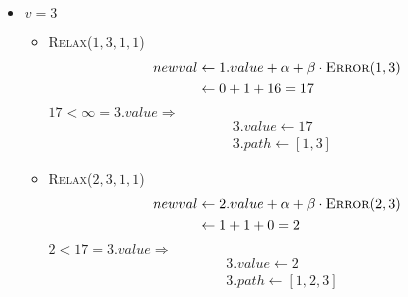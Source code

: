 \documentclass[a4paper]{scrartcl}
\begin{document}
\begin{enumerate}[(a)]
\begin{itemize}
            \item $v = 3$
                \begin{itemize}
                    \item \textsc{Relax}($1, 3, 1, 1$) \\
                        \begin{equation*}
                            \begin{split}
                                newval &\gets 1.value + \alpha + \beta \cdot \textsc{Error}(1, 3) \\
                                &\gets 0 + 1 + 16 = 17
                            \end{split}
                        \end{equation*}
                        $17 < \infty = 3.value \Rightarrow$
                        \begin{align*}
                            & 3.value \gets 17 \\
                            & 3.path \gets [1, 3]
                        \end{align*}

                    \item \textsc{Relax}($2, 3, 1, 1$) \\
                        \begin{equation*}
                            \begin{split}
                                newval &\gets 2.value + \alpha + \beta \cdot \textsc{Error}(2, 3) \\
                                &\gets 1 + 1 + 0 = 2
                            \end{split}
                        \end{equation*}
                        $2 < 17 = 3.value \Rightarrow$
                        \begin{align*}
                            & 3.value \gets 2 \\
                            & 3.path \gets [1, 2, 3]
                        \end{align*}

                \end{itemize}


\end{itemize}
\end{enumerate}
\end{document}
